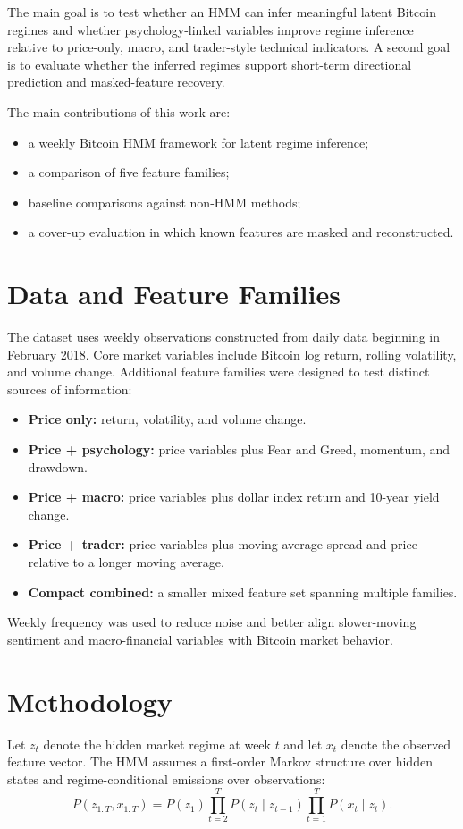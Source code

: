 \documentclass[conference]{IEEEtran}
\begin{document}
The main goal is to test whether an HMM can infer meaningful latent Bitcoin regimes and whether psychology-linked variables improve regime inference relative to price-only, macro, and trader-style technical indicators. A second goal is to evaluate whether the inferred regimes support short-term directional prediction and masked-feature recovery.

The main contributions of this work are:
\begin{itemize}
    \item a weekly Bitcoin HMM framework for latent regime inference;
    \item a comparison of five feature families;
    \item baseline comparisons against non-HMM methods;
    \item a cover-up evaluation in which known features are masked and reconstructed.
\end{itemize}

\section{Data and Feature Families}
The dataset uses weekly observations constructed from daily data beginning in February 2018. Core market variables include Bitcoin log return, rolling volatility, and volume change. Additional feature families were designed to test distinct sources of information:

\begin{itemize}
    \item \textbf{Price only:} return, volatility, and volume change.
    \item \textbf{Price + psychology:} price variables plus Fear and Greed, momentum, and drawdown.
    \item \textbf{Price + macro:} price variables plus dollar index return and 10-year yield change.
    \item \textbf{Price + trader:} price variables plus moving-average spread and price relative to a longer moving average.
    \item \textbf{Compact combined:} a smaller mixed feature set spanning multiple families.
\end{itemize}

Weekly frequency was used to reduce noise and better align slower-moving sentiment and macro-financial variables with Bitcoin market behavior.

\section{Methodology}
Let $z_t$ denote the hidden market regime at week $t$ and let $x_t$ denote the observed feature vector. The HMM assumes a first-order Markov structure over hidden states and regime-conditional emissions over observations:
\begin{equation}
P(z_{1:T}, x_{1:T}) = P(z_1)\prod_{t=2}^{T} P(z_t \mid z_{t-1}) \prod_{t=1}^{T} P(x_t \mid z_t).
\end{equation}
\end{document}
